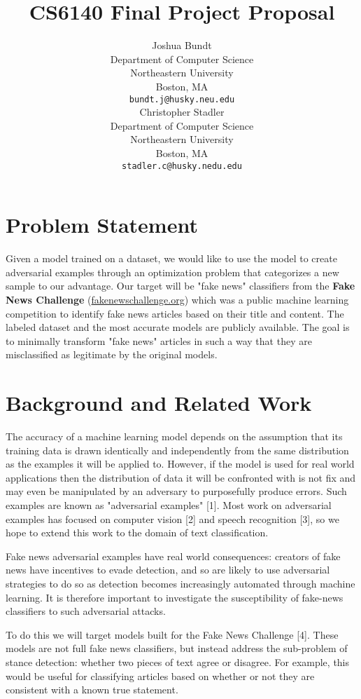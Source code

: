 \documentclass{article}
\title{CS6140 Final Project Proposal}
\author{
  Joshua Bundt \\
  Department of Computer Science\\
  Northeastern University\\
  Boston, MA \\
  \texttt{bundt.j@husky.neu.edu} \\
  \And
  Christopher Stadler \\
  Department of Computer Science \\
  Northeastern University \\
  Boston, MA \\
  \texttt{stadler.c@husky.nedu.edu} \\
}
\begin{document}

\maketitle


\section{Problem Statement}
\label{what}

Given a model trained on a dataset, we would like to use the model to create adversarial examples through an optimization problem that categorizes a new sample to our advantage. Our target will be "fake news" classifiers from the \textbf{Fake News Challenge}  (\href{http://fakenewschallenge.org}{fakenewschallenge.org}) which was a public machine learning competition to identify fake news articles based on their title and content. The labeled dataset and the most accurate models are publicly available.  The goal is to minimally transform "fake news" articles in such a way that they are misclassified as legitimate by the original models.

\section{Background and Related Work}
\label{why}
The accuracy of a machine learning model depends on the assumption that its training data is drawn identically and independently from the same distribution as the examples it will be applied to. However, if the model is used for real world applications then the distribution of data it will be confronted with is not fix and may even be manipulated by an adversary to purposefully produce errors. Such examples are known as "adversarial examples" [1]. Most work on adversarial examples has focused on computer vision [2] and speech recognition [3], so we hope to extend this work to the domain of text classification.

Fake news adversarial examples have real world consequences: creators of fake news have incentives to evade detection, and so are likely to use adversarial strategies to do so as detection becomes increasingly automated through machine learning. It is therefore important to investigate the susceptibility of fake-news classifiers to such adversarial attacks.

To do this we will target models built for the Fake News Challenge [4]. These models are not full fake news classifiers, but instead address the sub-problem of stance detection: whether two pieces of text agree or disagree. For example, this would be useful for classifying articles based on whether or not they are consistent with a known true statement.
\end{document}
